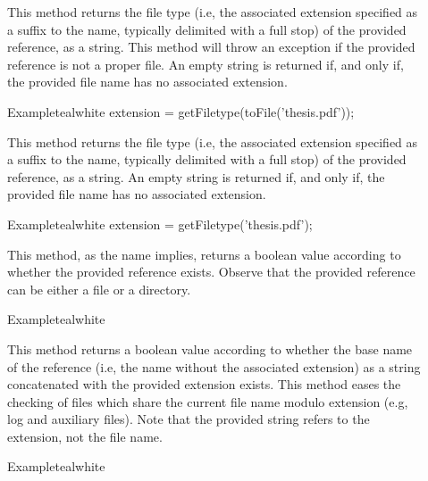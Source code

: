\begin{description}
\item[] This method returns the file type (i.e, the associated extension specified as a suffix to the name, typically delimited with a full stop) of the provided  reference, as a string. This method will throw an exception if the provided reference is not a proper file. An empty string is returned if, and only if, the provided file name has no associated extension.

\begin{codebox}{Example}{teal}{\icnote}{white}
extension = getFiletype(toFile('thesis.pdf'));
\end{codebox}

\item[] This method returns the file type (i.e, the associated extension specified as a suffix to the name, typically delimited with a full stop) of the provided  reference, as a string. An empty string is returned if, and only if, the provided file name has no associated extension.

\begin{codebox}{Example}{teal}{\icnote}{white}
extension = getFiletype('thesis.pdf');
\end{codebox}

\item[] This method, as the name implies, returns a boolean value according to whether the provided  reference exists. Observe that the provided reference can be either a file or a directory.

\begin{codebox}{Example}{teal}{\icnote}{white}
\end{codebox}

\item[] This method returns a boolean value according to whether the base name of the  reference (i.e, the name without the associated extension) as a string concatenated with the provided  extension exists. This method eases the checking of files which share the current file name modulo extension (e.g, log and auxiliary files). Note that the provided string refers to the extension, not the file name.

\begin{codebox}{Example}{teal}{\icnote}{white}
\end{codebox}


\end{description}
